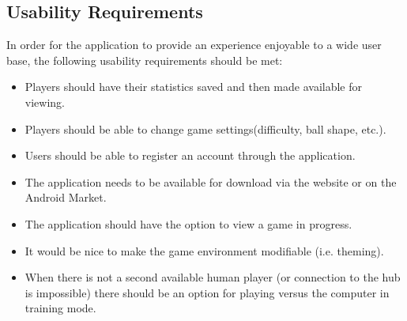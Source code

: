 \documentclass[12pt]{article}
\newenvironment{itemize*}%
  {\begin{itemize}%
  	\setlength{\parsep}{0pt}
    \setlength{\itemsep}{0pt}%
    \setlength{\parskip}{0pt}}%
  {\end{itemize}}
\begin{document}
\begin{itemize*}



\subsection{Usability Requirements}
In order for the application to provide an experience enjoyable to a wide user base, the following usability requirements should be met:
\begin{itemize}
\item Players should have their statistics saved and then made available for viewing.
\item Players should be able to change game settings(difficulty, ball shape, etc.).
\item Users should be able to register an account through the application.
\item The application needs to be available for download via the website or on the Android Market.
\item The application should have the option to view a game in progress.
\item It would be nice to make the game environment modifiable (i.e. theming).
\item When there is not a second available human player (or connection to the hub is impossible) there should be an option for playing versus the computer in training mode.
\end{itemize}


\end{itemize*}
\end{document}
